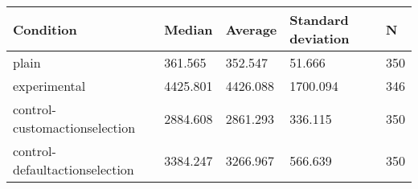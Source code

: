 \begin{center}
\begin{tabular}{|l|l|l|l|l|}
\hline
Condition & Median & Average & Standard deviation & N \\
\hline
plain & 361.565 & 352.547 & 51.666 & 350 \\
experimental & 4425.801 & 4426.088 & 1700.094 & 346 \\
control-customactionselection & 2884.608 & 2861.293 & 336.115 & 350 \\
control-defaultactionselection & 3384.247 & 3266.967 & 566.639 & 350 \\
\hline
\end{tabular}
\end{center}
